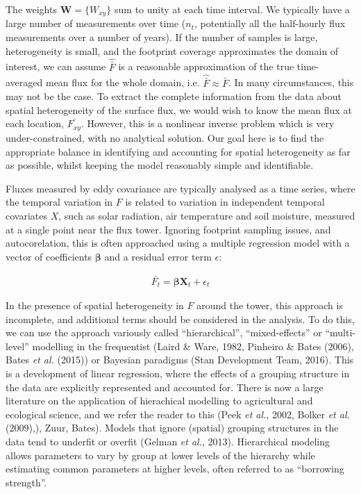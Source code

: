 The weights
\(\mathbf{W} = \{W_{xy}\}\) sum to unity at each time interval. We
typically have a large number of measurements over time (\(n_t\),
potentially all the half-hourly flux measurements over a number of
years). If the number of samples is large, heterogeneity is small, and
the footprint coverage approximates the domain of interest, we can
assume \(\widehat{\bar{F}}\) is a reasonable approximation of the true
time-averaged mean flux for the whole domain, i.e.
\(\widehat{\bar{F}} \approx \bar{F}\). In many circumstances, this may
not be the case. To extract the complete information from the data about
spatial heterogeneity of the surface flux, we would wish to know the
mean flux at each location, \(\bar{F_{xy}}\). However, this is a
nonlinear inverse problem which is very under-constrained, with no
analytical solution. Our goal here is to find the appropriate balance in
identifying and accounting for spatial heterogeneity as far as possible,
whilst keeping the model reasonably simple and identifiable.

Fluxes measured by eddy covariance are typically analysed as a time
series, where the temporal variation in \(F\) is related to variation in
independent temporal covariates \(X\), such as solar radiation, air
temperature and soil moisture, measured at a single point near the flux
tower. Ignoring footprint sampling issues, and autocorelation, this is
often approached using a multiple regression model with a vector of
coefficients \(\boldsymbol{\beta}\) and a residual error term
\(\epsilon\):

\begin{align}   \label{eq:timeVarn}
  \bar{F_t} = \boldsymbol{\beta} \mathbf{X}_t + \epsilon_{t}
\end{align}

In the presence of spatial heterogeneity in \(F\) around the tower, this
approach is incomplete, and additional terms should be considered in the
analysis. To do this, we can use the approach variously called
``hierarchical'', ``mixed-effects'' or ``multi-level'' modelling in the
frequentist (Laird \& Ware, 1982, Pinheiro \& Bates (2006), Bates
\emph{et al.} (2015)) or Bayesian paradigms (Stan Development Team,
2016). This is a development of linear regression, where the effects of
a grouping structure in the data are explicitly represented and
accounted for. There is now a large literature on the application of
hierachical modelling to agricultural and ecological science, and we
refer the reader to this (Peek \emph{et al.}, 2002, Bolker \emph{et al.}
(2009),), Zuur, Bates). Models that ignore (spatial) grouping structures
in the data tend to underfit or overfit (Gelman \emph{et al.}, 2013).
Hierarchical modeling allows parameters to vary by group at lower levels
of the hierarchy while estimating common parameters at higher levels,
often referred to as ``borrowing strength''.

